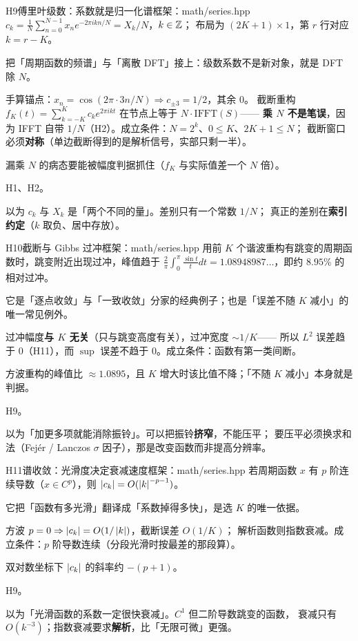 \begin{know}{H9}{傅里叶级数：系数就是归一化谱}{框架：math/series.hpp}
 $c_k=\frac1N\sum_{n=0}^{N-1}x_ne^{-2\pi ikn/N}=X_k/N$，$k\in\mathbb{Z}$；
布局为 $(2K+1)\times1$，第 $r$ 行对应 $k=r-K$。

 把「周期函数的频谱」与「离散 DFT」接上：级数系数不是新对象，就是 DFT 除 $N$。

 手算锚点：$x_n=\cos(2\pi\cdot3n/N)\Rightarrow c_{\pm3}=1/2$，其余 $0$。
截断重构 $f_K(t)=\sum_{k=-K}^{K}c_ke^{2\pi ikt}$ 在节点上等于 $N\cdot\mathrm{IFFT}(S)$——
\textbf{乘 $N$ 不是笔误}，因为 IFFT 自带 $1/N$（H2）。成立条件：$N=2^{k}$、$0\le K$、$2K+1\le N$；
截断窗口必须\textbf{对称}（单边截断得到的是解析信号，实部只剩一半）。

 漏乘 $N$ 的病态要能被幅度判据抓住（$f_K$ 与实际值差一个 $N$ 倍）。

 H1、H2。

 以为 $c_k$ 与 $X_k$ 是「两个不同的量」。差别只有一个常数 $1/N$；
真正的差别在\textbf{索引约定}（$k$ 取负、居中存放）。
\end{know}

\begin{know}{H10}{截断与 Gibbs 过冲}{框架：math/series.hpp}
 用前 $K$ 个谐波重构有跳变的周期函数时，跳变附近出现过冲，峰值趋于
$\frac2\pi\int_0^{\pi}\frac{\sin t}{t}dt=1.08948987\ldots$，即约 $8.95\%$ 的相对过冲。

 它是「逐点收敛」与「一致收敛」分家的经典例子；也是「误差不随 $K$ 减小」的唯一常见例外。

 过冲幅度\textbf{与 $K$ 无关}（只与跳变高度有关），过冲宽度 $\sim1/K$——
所以 $L^{2}$ 误差趋于 0（H11），而 $\sup$ 误差不趋于 0。成立条件：函数有第一类间断。

 方波重构的峰值比 $\approx1.0895$，且 $K$ 增大时该比值不降；「不随 $K$ 减小」本身就是判据。

 H9。

 以为「加更多项就能消除振铃」。可以把振铃\textbf{挤窄}，不能压平；
要压平必须换求和法（Fejér / Lanczos $\sigma$ 因子），那是改变函数而非提高分辨率。
\end{know}

\begin{know}{H11}{谱收敛：光滑度决定衰减速度}{框架：math/series.hpp}
 若周期函数 $x$ 有 $p$ 阶连续导数（$x\in C^{p}$），则 $\left\lvert c_k\right\rvert=O(\left\lvert k\right\rvert^{-p-1})$。

 它把「函数有多光滑」翻译成「系数掉得多快」，是选 $K$ 的唯一依据。

 方波 $p=0\Rightarrow\left\lvert c_k\right\rvert=O(1/\left\lvert k\right\rvert)$，截断误差 $O(1/K)$；
解析函数则指数衰减。成立条件：$p$ 阶导数连续（分段光滑时按最差的那段算）。

 双对数坐标下 $\left\lvert c_k\right\rvert$ 的斜率约 $-(p+1)$。

 H9。

 以为「光滑函数的系数一定很快衰减」。$C^{1}$ 但二阶导数跳变的函数，
衰减只有 $O(k^{-3})$；指数衰减要求\textbf{解析}，比「无限可微」更强。
\end{know}
